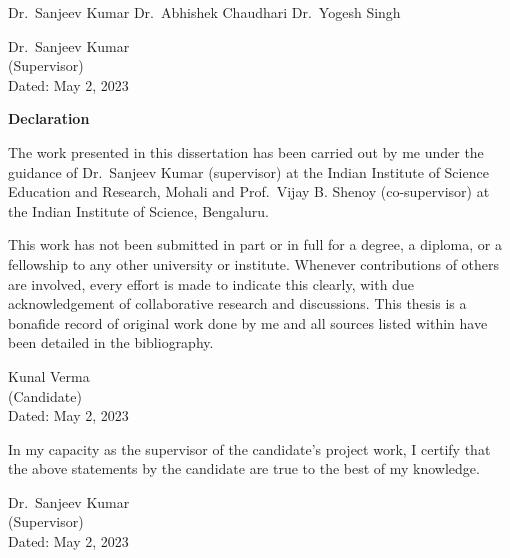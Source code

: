 \documentclass[a4paper,12pt]{report}
\numberwithin{equation}{section}
\begin{document}
Dr.~Sanjeev Kumar \hspace{1.5cm} Dr.~Abhishek Chaudhari \hspace{1.5cm}  Dr.~Yogesh Singh

\vspace{4cm}

\begin{flushright}
    Dr.~Sanjeev Kumar
    \\
    (Supervisor)
    \\
    \vspace{4cm}
    Dated: May 2, 2023
\end{flushright}

\cleardoublepage

\begin{center}
    \textsf{\textbf{\Large Declaration}} 
\end{center}
\vspace*{1em}

The work presented in this dissertation has been carried out by me under the guidance of Dr.~Sanjeev Kumar (supervisor) at the Indian Institute of Science Education and Research, Mohali and Prof.~Vijay B. Shenoy (co-supervisor) at the Indian Institute of Science, Bengaluru.

\vspace{0.4cm}

This work has not been submitted in part or in full for a degree, a diploma, or a fellowship to any other university or institute. Whenever contributions of others are involved, every effort is made to indicate this clearly, with due acknowledgement of collaborative research and discussions. This thesis is a bonafide record of original work done by me and all sources listed within have been detailed in the bibliography.

\vspace{2cm}

\begin{flushright}
Kunal Verma
\\
(Candidate)
\\
Dated: May 2, 2023
\end{flushright}
\vspace*{1em}

In my capacity as the supervisor of the candidate's project work, I certify that the above statements by the candidate are true to the best of my knowledge.

\vspace{2cm}

\begin{flushright}
Dr.~Sanjeev Kumar
\\
(Supervisor)
\\
Dated: May 2, 2023
\end{flushright}
\end{document}
